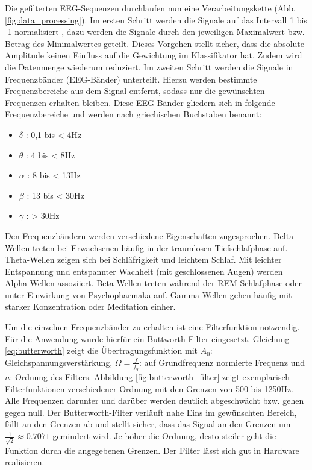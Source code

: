 \label{sec:processing}
Die gefilterten EEG-Sequenzen durchlaufen nun eine Verarbeitungskette (Abb. \ref{fig:data_processing}). Im ersten Schritt werden die Signale auf das Intervall 1 bis -1 normalisiert , dazu werden die Signale durch den jeweiligen Maximalwert bzw. Betrag des Minimalwertes geteilt. Dieses Vorgehen stellt sicher, dass die absolute Amplitude keinen Einfluss auf die Gewichtung im Klassifikator hat. Zudem wird die Datenmenge wiederum reduziert. Im zweiten Schritt werden die Signale in Frequenzbänder (EEG-Bänder) unterteilt. Hierzu werden bestimmte Frequenzbereiche aus dem Signal entfernt, sodass nur die gewünschten Frequenzen erhalten bleiben. Diese EEG-Bänder gliedern sich in folgende Frequenzbereiche und werden nach griechischen Buchstaben benannt:
\begin{itemize}
 \item $\delta$ : 0,1 bis < 4Hz
 \item $\theta$ :   4 bis < 8Hz
 \item $\alpha$ :   8 bis < 13Hz
 \item $\beta$  :  13 bis < 30Hz
 \item $\gamma$ :  > 30Hz
\end{itemize}
Den Frequenzbändern werden verschiedene Eigenschaften zugesprochen. Delta Wellen treten bei Erwachsenen häufig in der traumlosen Tiefschlafphase auf. Theta-Wellen zeigen sich bei Schläfrigkeit und leichtem Schlaf. Mit leichter Entspannung und entspannter Wachheit (mit geschlossenen Augen) werden Alpha-Wellen assoziiert. Beta Wellen treten während der REM-Schlafphase oder unter Einwirkung von Psychopharmaka auf. Gamma-Wellen gehen häufig mit starker Konzentration oder Meditation einher.

Um die einzelnen Frequenzbänder zu erhalten ist eine Filterfunktion notwendig. Für die Anwendung wurde hierfür ein Buttworth-Filter\cite{Butterworth30} eingesetzt. Gleichung \ref{eq:butterworth} zeigt die Übertragungsfunktion mit $A_0$: Gleichspannungsverstärkung, $\Omega = \frac{f}{f_g}$: auf Grundfrequenz normierte Frequenz und $n$: Ordnung des Filters. Abbildung \ref{fig:butterworth_filter} zeigt exemplarisch Filterfunktionen verschiedener Ordnung mit den Grenzen von 500 bis 1250Hz. Alle Frequenzen darunter und darüber werden deutlich abgeschwächt bzw. gehen gegen null. Der Butterworth-Filter verläuft nahe Eins im gewünschten Bereich, fällt an den Grenzen ab und stellt sicher, dass das Signal an den Grenzen um $\frac{1}{\sqrt{2}} \approx 0.7071$ gemindert wird. Je höher die Ordnung, desto steiler geht die Funktion durch die angegebenen Grenzen. Der Filter lässt sich gut in Hardware realisieren.

